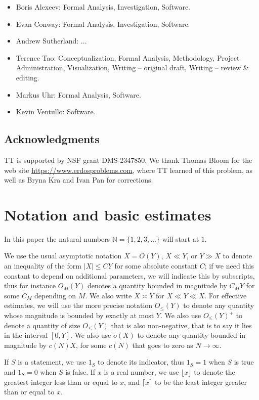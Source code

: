\documentclass[12pt,a4paper,reqno]{amsart}
\numberwithin{equation}{section}
\theoremstyle{plain}
\theoremstyle{definition}
\newcommand\N{\mathbb{N}}
\begin{document}
\begin{itemize}
\item Boris Alexeev: Formal Analysis, Investigation, Software.
\item Evan Conway: Formal Analysis, Investigation, Software.
\item Andrew Sutherland: ...
\item Terence Tao: Conceptualization, Formal Analysis, Methodology, Project Administration, Visualization, Writing -- original draft, Writing -- review \& editing.
\item Markus Uhr: Formal Analysis, Software.
\item Kevin Ventullo: Software.
\end{itemize}

\subsection{Acknowledgments}

TT is supported by NSF grant DMS-2347850.  We thank Thomas Bloom for the web site \url{https://www.erdosproblems.com}, where TT learned of this problem, as well as Bryna Kra and Ivan Pan for  corrections.


\section{Notation and basic estimates}

In this paper the natural numbers $\N=\{1,2,3,\dots\}$ will start at $1$.

We use the usual asymptotic notation $X = O(Y)$, $X \ll Y$, or $Y \gg X$ to denote an inequality of the form $|X| \leq CY$ for some absolute constant $C$; if we need this constant to depend on additional parameters, we will indicate this by subscripts, thus for instance $O_M(Y)$ denotes a quantity bounded in magnitude by $C_M Y$ for some $C_M$ depending on $M$.  We also write $X \asymp Y$ for $X \ll Y \ll X$. For effective estimates, we will use the more precise notation $O_{\leq}(Y)$ to denote any quantity whose magnitude is bounded by exactly at most $Y$. We also use $O_{\leq}(Y)^+$ to denote a quantity of size $O_{\leq}(Y)$ that is also non-negative, that is to say it lies in the interval $[0,Y]$.  We also use $o(X)$ to denote any quantity bounded in magnitude by $c(N) X$, for some $c(N)$ that goes to zero as $N \to \infty$.

If $S$ is a statement, we use $1_S$ to denote its indicator, thus $1_S=1$ when $S$ is true and $1_S=0$ when $S$ is false.  If $x$ is a real number, we use $\lfloor x \rfloor$ to denote the greatest integer less than or equal to $x$, and $\lceil x \rceil$ to be the least integer greater than or equal to $x$.
\end{document}
